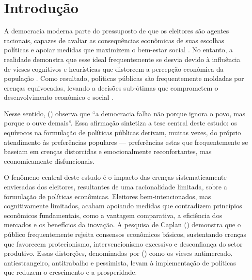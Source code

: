 

\chapter{Introdução} %


A democracia moderna parte do pressuposto de que os eleitores são agentes racionais, capazes de avaliar as consequências econômicas de suas escolhas políticas e apoiar medidas que maximizem o bem-estar social \cite{downs1957economic}. No entanto, a realidade demonstra que esse ideal frequentemente se desvia devido à influência de vieses cognitivos e heurísticas que distorcem a percepção econômica da população \cite{The_Myth_of_the_Rational_Voter,kahneman2011thinking}. Como resultado, políticas públicas são frequentemente moldadas por crenças equivocadas, levando a decisões sub-ótimas que comprometem o desenvolvimento econômico e social \cite{acemoglu2012nations}.

Nesse sentido, \citeauthor{The_Myth_of_the_Rational_Voter} (\citeyear{The_Myth_of_the_Rational_Voter}) observa que ``a democracia falha não porque ignora o povo, mas porque o ouve demais''. Essa afirmação sintetiza a tese central deste estudo: os equívocos na formulação de políticas públicas derivam, muitas vezes, do próprio atendimento às preferências populares — preferências estas que frequentemente se baseiam em crenças distorcidas e emocionalmente reconfortantes, mas economicamente disfuncionais.

O fenômeno central deste estudo é o impacto das crenças sistematicamente enviesadas dos eleitores, resultantes de uma racionalidade limitada, sobre a formulação de políticas econômicas. Eleitores bem-intencionados, mas cognitivamente limitados, acabam apoiando medidas que contradizem princípios econômicos fundamentais, como a vantagem comparativa, a eficiência dos mercados e os benefícios da inovação. A pesquisa de Caplan (\citeyear{Systematically_Biased_Beliefs_about_Economics,The_Myth_of_the_Rational_Voter}) demonstra que o público frequentemente rejeita consensos econômicos básicos, sustentando crenças que favorecem protecionismo, intervencionismo excessivo e desconfiança do setor produtivo. Essas distorções, denominadas por  (\citeyear{The_Myth_of_the_Rational_Voter}) como os vieses antimercado, antiestrangeiro, antitrabalho e pessimista, levam à implementação de políticas que reduzem o crescimento e a prosperidade.

